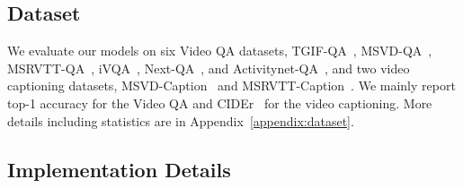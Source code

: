 \documentclass{article}
\begin{document}
\subsection{Dataset}

We evaluate our models on six Video QA datasets, TGIF-QA~\cite{jang2017tgif}, MSVD-QA~\cite{xu2017video}, MSRVTT-QA~\cite{xu2017video}, iVQA~\cite{yang2021just}, Next-QA~\cite{xiao2021next}, and Activitynet-QA~\cite{yu2019activitynet}, and two video captioning datasets, MSVD-Caption~\cite{chen2011collecting} and MSRVTT-Caption~\cite{xu2016msr}. We mainly report top-1 accuracy for the Video QA and CIDEr~\cite{vedantam2015cider} for the video captioning. More details including statistics are in Appendix~\ref{appendix:dataset}.

\subsection{Implementation Details}
\end{document}
